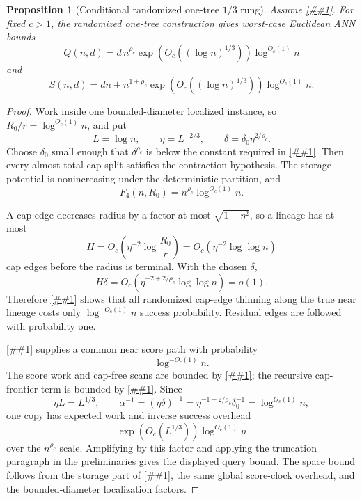 \documentclass[10pt]{article}
\newcommand{\cref}[1]{\ref{##1}}
\newcommand{\Cref}[1]{\ref{##1}}
\newtheorem{proposition}[theorem]{Proposition}
\theoremstyle{definition}
\begin{document}
\begin{proposition}[Conditional randomized one-tree \(1/3\) rung]\label{prop:one-third}
   Assume \cref{asm:mixed-operator}. For fixed $c>1$, the randomized one-tree construction gives worst-case Euclidean ANN bounds
   \[
      Q(n,d)
      =
      d\,n^{\rho_c}
      \exp\!\left(O_c((\log n)^{1/3})\right)
      \log^{O_c(1)}n
   \]
   and
   \[
      S(n,d)
      =
      dn+n^{1+\rho_c}
      \exp\!\left(O_c((\log n)^{1/3})\right)
      \log^{O_c(1)}n.
   \]
\end{proposition}

\begin{proof}
   Work inside one bounded-diameter localized instance, so $R_0/r=\log^{O_c(1)}n$, and put
   \[
      L=\log n,
      \qquad
      \eta=L^{-2/3},
      \qquad
      \delta=\delta_0\eta^{2/\rho_c}.
   \]
   Choose $\delta_0$ small enough that $\delta^{\rho_c}$ is below the constant required in \cref{lem:thin-cap-contraction}. Then every almost-total cap split satisfies the contraction hypothesis. The storage potential is nonincreasing under the deterministic partition, and
   \[
      F_4(n,R_0)=n^{\rho_c}\log^{O_c(1)}n.
   \]

   A cap edge decreases radius by a factor at most $\sqrt{1-\eta^2}$, so a lineage has at most
   \[
      H=O_c\!\left(\eta^{-2}\log\frac{R_0}{r}\right)
      =
      O_c(\eta^{-2}\log\log n)
   \]
   cap edges before the radius is terminal. With the chosen $\delta$,
   \[
      H\delta
      =
      O_c(\eta^{-2+2/\rho_c}\log\log n)
      =
      o(1).
   \]
   Therefore \cref{lem:thin-lineage} shows that all randomized cap-edge thinning along the true near lineage costs only $\log^{-O_c(1)}n$ success probability. Residual edges are followed with probability one.

   \Cref{lem:adaptive-continuation} supplies a common near score path with probability
   \[
      \log^{-O_c(1)}n.
   \]
   The score work and cap-free scans are bounded by \cref{lem:cap-free-scan-accounting}; the recursive cap-frontier term is bounded by \cref{asm:mixed-operator}. Since
   \[
      \eta L=L^{1/3},
      \qquad
      \alpha^{-1}=(\eta\delta)^{-1}=\eta^{-1-2/\rho_c}\delta_0^{-1}=\log^{O_c(1)}n,
   \]
   one copy has expected work and inverse success overhead
   \[
      \exp(O_c(L^{1/3}))\log^{O_c(1)}n
   \]
   over the $n^{\rho_c}$ scale. Amplifying by this factor and applying the truncation paragraph in the preliminaries gives the displayed query bound. The space bound follows from the storage part of \cref{lem:thin-cap-contraction}, the same global score-clock overhead, and the bounded-diameter localization factors.
\end{proof}
\end{document}
